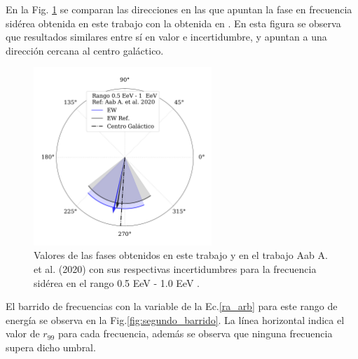     En la Fig. \ref{fig:segundo} se comparan las direcciones en las que apuntan la fase en frecuencia sidérea obtenida en este trabajo con la obtenida en \cite{Aab_2020}. En esta figura se observa que resultados similares entre sí en valor e incertidumbre, y apuntan a una dirección cercana al centro galáctico.

    
    \begin{figure}[H]
        \begin{small}
            \begin{center}
                \includegraphics[width=0.6\textwidth]{phase_segundo_bin_v3.pdf}
                \vspace*{-1 cm}
            \end{center}
            \caption{Valores de las fases obtenidos en este trabajo y en el trabajo Aab A.  et al. (2020) con sus respectivas incertidumbres para la frecuencia sidérea en el rango 0.5 EeV - 1.0 EeV .}
            \label{fig:segundo}
        \end{small}
    \end{figure}

    El barrido de frecuencias con la variable de la Ec.\ref{ra_arb} para este rango de energía se observa en la Fig.\ref{fig:segundo_barrido}. La línea horizontal indica el valor de $r_{99}$ para cada frecuencia, además se observa que ninguna frecuencia supera dicho umbral. 

